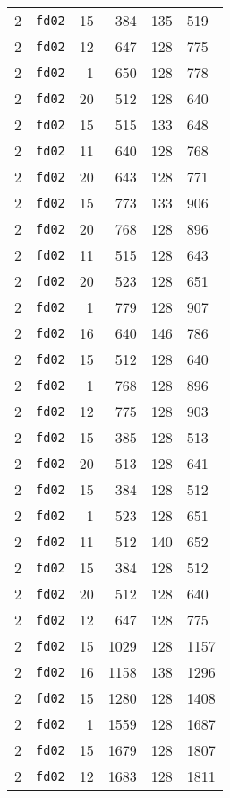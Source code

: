 \documentclass{article}
\begin{document}
\begin{table}[h!]
\begin{tabular}{llrrrl}
    2 & \texttt{fd02} & 15 & 384 & 135 & 519 \\
    2 & \texttt{fd02} & 12 & 647 & 128 & 775 \\
    2 & \texttt{fd02} & 1 & 650 & 128 & 778 \\
    2 & \texttt{fd02} & 20 & 512 & 128 & 640 \\
    2 & \texttt{fd02} & 15 & 515 & 133 & 648 \\
    2 & \texttt{fd02} & 11 & 640 & 128 & 768 \\
    2 & \texttt{fd02} & 20 & 643 & 128 & 771 \\
    2 & \texttt{fd02} & 15 & 773 & 133 & 906 \\
    2 & \texttt{fd02} & 20 & 768 & 128 & 896 \\
    2 & \texttt{fd02} & 11 & 515 & 128 & 643 \\
    2 & \texttt{fd02} & 20 & 523 & 128 & 651 \\
    2 & \texttt{fd02} & 1 & 779 & 128 & 907 \\
    2 & \texttt{fd02} & 16 & 640 & 146 & 786 \\
    2 & \texttt{fd02} & 15 & 512 & 128 & 640 \\
    2 & \texttt{fd02} & 1 & 768 & 128 & 896 \\
    2 & \texttt{fd02} & 12 & 775 & 128 & 903 \\
    2 & \texttt{fd02} & 15 & 385 & 128 & 513 \\
    2 & \texttt{fd02} & 20 & 513 & 128 & 641 \\
    2 & \texttt{fd02} & 15 & 384 & 128 & 512 \\
    2 & \texttt{fd02} & 1 & 523 & 128 & 651 \\
    2 & \texttt{fd02} & 11 & 512 & 140 & 652 \\
    2 & \texttt{fd02} & 15 & 384 & 128 & 512 \\
    2 & \texttt{fd02} & 20 & 512 & 128 & 640 \\
    2 & \texttt{fd02} & 12 & 647 & 128 & 775 \\
    2 & \texttt{fd02} & 15 & 1029 & 128 & 1157 \\
    2 & \texttt{fd02} & 16 & 1158 & 138 & 1296 \\
    2 & \texttt{fd02} & 15 & 1280 & 128 & 1408 \\
    2 & \texttt{fd02} & 1 & 1559 & 128 & 1687 \\
    2 & \texttt{fd02} & 15 & 1679 & 128 & 1807 \\
    2 & \texttt{fd02} & 12 & 1683 & 128 & 1811 \\

\end{tabular}
\end{table}
\end{document}
